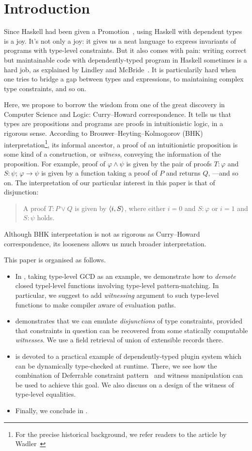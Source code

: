 \documentclass[demotion-paper.tex]{subfiles}
\begin{document}
\section{Introduction}
Since Haskell had been given a Promotion~\cite{Yorgey:2012}, using Haskell with dependent types is a joy.
It's not only a joy: it gives us a neat language to express invariants of programs with type-level constraints.
But it also comes with pain: writing correct but maintainable code with dependently-typed program in Haskell sometimes is a hard job, as explained by Lindley and McBride~\cite{10.1145/2503778.2503786}.
It is particularily hard when one tries to bridge a gap between types and expressions, to maintaining complex type constraints, and so on.

Here, we propose to borrow the wisdom from one of the great discovery in Computer Science and Logic: Curry--Howard correspondence.
It tells us that types are propositions and programs are proofs in intuitionistic logic, in a rigorous sense.
According to Brouwer--Heyting--Kolmogorov (BHK) interpretation\footnote{For the precise historical background, we refer readers to the article by Wadler~\cite{Wadler:2015aa}}, its informal ancestor, a proof of an intuitionistic proposition is some kind of a construction, or \emph{witness}, conveying the information of the proposition.
For example, proof of $\varphi \land \psi$ is given by the pair of proofs $T: \varphi$ and $S: \psi$; $\varphi \to \psi$ is given by a function taking a proof of $P$ and returns $Q$, ---and so on.
The interpretation of our particular interest in this paper is that of disjunction:
\begin{quote}
  A proof $T: P \vee Q$ is given by $\braket{i, S}$, where either $i = 0$ and $S: \varphi$ or $i = 1$ and $S: \psi$ holds.
\end{quote}
Although BHK interpretation is not as rigorous as Curry--Howard correspondence, its looseness allows us much broader interpretation.

This paper is organised as follows.
\begin{itemize}
  \item In , taking type-level GCD as an example, we demonstrate how to \emph{demote} closed typel-level functions involving type-level pattern-matching.
  In particular, we suggest to add \emph{witnessing} argument to such type-level functions to make compiler aware of evaluation paths.
  \item {} demonstrates that we can emulate \emph{disjunctions} of type constraints, provided that constraints in question can be recovered from some statically computable \emph{witnesses}.
  We use a field retrieval of union of extensible records there.
  \item {} is devoted to a practical example of dependently-typed plugin system which can be dynamically type-checked at runtime.
  There, we see how the combination of Deferrable constraint pattern~\cite{Kmett:2020ab} and witness manipulation can be used to achieve this goal.
  We also discuss on a design of the witness of type-level equalities.
  \item Finally, we conclude in .
\end{itemize}
\end{document}

